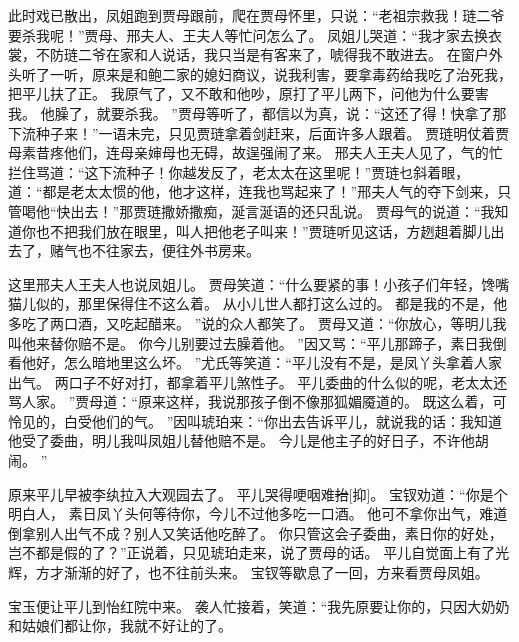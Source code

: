 此时戏已散出，凤姐跑到贾母跟前，爬在贾母怀里，只说：“老祖宗救我！琏二爷要杀我呢！”贾母、邢夫人、王夫人等忙问怎么了。
凤姐儿哭道：“我才家去换衣裳，不防琏二爷在家和人说话，我只当是有客来了，唬得我不敢进去。
在窗户外头听了一听，原来是和鲍二家的媳妇商议，说我利害，要拿毒药给我吃了治死我，把平儿扶了正。
我原气了，又不敢和他吵，原打了平儿两下，问他为什么要害我。
他臊了，就要杀我。
”贾母等听了，都信以为真，说：“这还了得！快拿了那下流种子来！”一语未完，只见贾琏拿着剑赶来，后面许多人跟着。
贾琏明仗着贾母素昔疼他们，连母亲婶母也无碍，故逞强闹了来。
邢夫人王夫人见了，气的忙拦住骂道：“这下流种子！你越发反了，老太太在这里呢！”贾琏乜斜着眼，道：“都是老太太惯的他，他才这样，连我也骂起来了！”邢夫人气的夺下剑来，只管喝他“快出去！”那贾琏撒娇撒痴，涎言涎语的还只乱说。
贾母气的说道：“我知道你也不把我们放在眼里，叫人把他老子叫来！”贾琏听见这话，方趔趄着脚儿出去了，赌气也不往家去，便往外书房来。
\par
这里邢夫人王夫人也说凤姐儿。
贾母笑道：“什么要紧的事！小孩子们年轻，馋嘴猫儿似的，那里保得住不这么着。
从小儿世人都打这么过的。
都是我的不是，他多吃了两口酒，又吃起醋来。
”说的众人都笑了。
贾母又道：“你放心，等明儿我叫他来替你赔不是。
你今儿别要过去臊着他。
”因又骂：“平儿那蹄子，素日我倒看他好，怎么暗地里这么坏。
”尤氏等笑道：“平儿没有不是，是凤丫头拿着人家出气。
两口子不好对打，都拿着平儿煞性子。
平儿委曲的什么似的呢，老太太还骂人家。
”贾母道：“原来这样，我说那孩子倒不像那狐媚魇道的。
既这么着，可怜见的，白受他们的气。
”因叫琥珀来：“你出去告诉平儿，就说我的话：我知道他受了委曲，明儿我叫凤姐儿替他赔不是。
今儿是他主子的好日子，不许他胡闹。
”\par
原来平儿早被李纨拉入大观园去了。
平儿哭得哽咽难\sout{抬}[抑]。
宝钗劝道：“你是个明白人，
素日凤丫头何等待你，今儿不过他多吃一口酒。
他可不拿你出气，难道倒拿别人出气不成？别人又笑话他吃醉了。
你只管这会子委曲，素日你的好处，岂不都是假的了？”正说着，只见琥珀走来，说了贾母的话。
平儿自觉面上有了光辉，方才渐渐的好了，也不往前头来。
宝钗等歇息了一回，方来看贾母凤姐。
\par
宝玉便让平儿到怡红院中来。
袭人忙接着，笑道：“我先原要让你的，只因大奶奶和姑娘们都让你，我就不好让的了。
